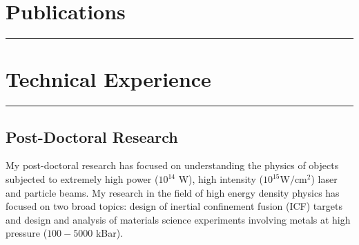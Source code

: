 \documentclass[letterpaper,11pt]{article}
\begin{document}


\section*{Publications}
\hrule
\vspace{0.05in}













\section*{Technical Experience}
\hrule
\vspace{0.05in}

\subsection*{Post-Doctoral Research}
My post-doctoral research has focused on understanding the physics of objects
subjected to extremely high power ($10^{14}$ W), high intensity ($10^{15}
\text{W}/\text{cm}^2$) laser and particle beams.  My research in the field of
high energy density physics has focused on two broad topics: design of inertial
confinement fusion (ICF) targets and design and analysis of materials science
experiments involving metals at high pressure ($100 - 5000$ kBar).
\end{document}
